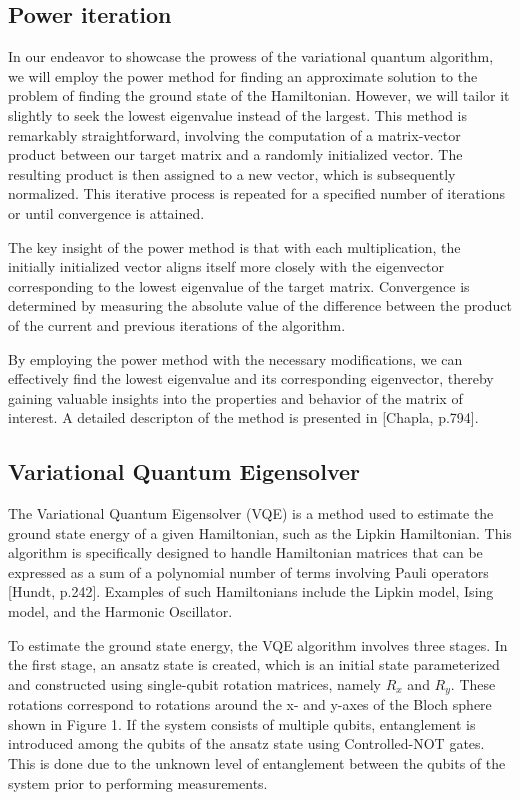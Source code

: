 \documentclass[onecolumn,10pt,cleanfoot]{asme2ej}
\begin{document}
\subsection{Power iteration}
In our endeavor to showcase the prowess of the variational quantum algorithm, we will employ the power method for finding an approximate solution to the problem of finding the ground state of the Hamiltonian. However, we will tailor it slightly to seek the lowest eigenvalue instead of the largest. This method is remarkably straightforward, involving the computation of a matrix-vector product between our target matrix and a randomly initialized vector. The resulting product is then assigned to a new vector, which is subsequently normalized. This iterative process is repeated for a specified number of iterations or until convergence is attained.

The key insight of the power method is that with each multiplication, the initially initialized vector aligns itself more closely with the eigenvector corresponding to the lowest eigenvalue of the target matrix. Convergence is determined by measuring the absolute value of the difference between the product of the current and previous iterations of the algorithm.

By employing the power method with the necessary modifications, we can effectively find the lowest eigenvalue and its corresponding eigenvector, thereby gaining valuable insights into the properties and behavior of the matrix of interest. A detailed descripton of the method is presented in [Chapla, p.794].


\subsection{Variational Quantum Eigensolver}
The Variational Quantum Eigensolver (VQE) is a method used to estimate the ground state energy of a given Hamiltonian, such as the Lipkin Hamiltonian. This algorithm is specifically designed to handle Hamiltonian matrices that can be expressed as a sum of a polynomial number of terms involving Pauli operators [Hundt, p.242]. Examples of such Hamiltonians include the Lipkin model, Ising model, and the Harmonic Oscillator.

To estimate the ground state energy, the VQE algorithm involves three stages. In the first stage, an ansatz state is created, which is an initial state parameterized and constructed using single-qubit rotation matrices, namely $R_x$ and $R_y$. These rotations correspond to rotations around the x- and y-axes of the Bloch sphere shown in Figure 1. If the system consists of multiple qubits, entanglement is introduced among the qubits of the ansatz state using Controlled-NOT gates. This is done due to the unknown level of entanglement between the qubits of the system prior to performing measurements.
\end{document}
